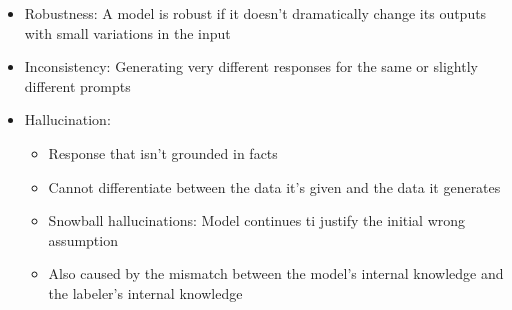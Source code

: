 \documentclass[11pt]{scrartcl}
\begin{document}
\begin{itemize}
\begin{itemize}
	\end{itemize}
	\item Robustness: A model is robust if it doesn't dramatically change its outputs with small variations in the input
	\item Inconsistency: Generating very different responses for the same or slightly different prompts
	\item Hallucination:
	\begin{itemize}
		\item Response that isn't grounded in facts
		\item Cannot differentiate between the data it's given and the data it generates
		\item Snowball hallucinations: Model continues ti justify the initial wrong assumption
		\item Also caused by the mismatch between the model's internal knowledge and the labeler's internal knowledge
	\end{itemize}
\end{itemize}
\end{document}
